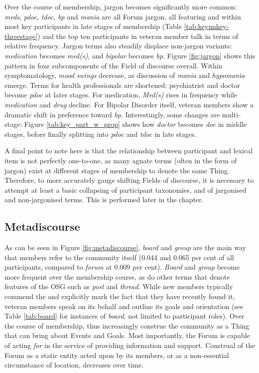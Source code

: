 Over the course of membership, jargon becomes significantly more common: \emph{meds}, \emph{pdoc}, \emph{tdoc}, \emph{bp} and \emph{mania} are all \gls{Forum} jargon, all featuring and within most key participants in late stages of membership (Table \ref{tab:keyunkey-threestage}) and the top ten participants in veteran \gls{member} talk in terms of relative frequency. Jargon terms also steadily displace non\hyp{}jargon variants: \emph{medication} becomes \emph{med(s)}, and \emph{bipolar} becomes \emph{bp}. Figure \ref{fig:jargon} shows this pattern in four subcomponents of the Field of discourse overall. Within symptomatology, \emph{mood swings} decrease, as discussion of \emph{mania} and \emph{hypomania} emerge. Terms for health professionals are shortened: psychiatrist and doctor become \emph{pdoc} at later stages. For medication, \emph{Med(s)} rises in frequency while \emph{medication} and \emph{drug} decline. For Bipolar Disorder itself, veteran members show a dramatic shift in preference toward \emph{bp}. Interestingly, some changes are multi\hyp{}stage: Figure \ref{tab:key_part_w_prop} shows how \emph{doctor} becomes \emph{doc} in middle stages, before finally splitting into \emph{pdoc} and \emph{tdoc} in late stages.

A final point to note here is that the relationship between participant and lexical item is not perfectly one\hyp{}to\hyp{}one, as many agnate terms (often in the form of jargon) exist at different stages of membership to denote the same Thing. Therefore, to more accurately gauge shifting Fields of discourse, it is necessary to attempt at least a basic collapsing of participant taxonomies, and of jargonised and non\hyp{}jargonised terms. This is performed later in the chapter.

\subsection{Metadiscourse}

As can be seen in Figure \ref{fig:metadiscourse}, \emph{board} and \emph{group} are the main way that members refer to the community itself (0.044 and 0.065 per cent of all participants, compared to \emph{forum} at 0.009 per cent). \emph{Board} and \emph{group} become more frequent over the membership course, as do other terms that denote features of the \gls{OSG} such as \emph{post} and \emph{thread}. While new \glspl{member} typically commend the  and explicitly mark the fact that they have recently found it, veteran \glspl{member} speak on its behalf and outline its goals and orientation (see Table \ref{tab:board} for instances of \emph{board}, not limited to participant roles). Over the course of membership,  thus increasingly construe the community as a Thing that can bring about Events and Goals. Most importantly, the \gls{Forum} is capable of acting \emph{for}  in the service of providing information and support. Construal of the \gls{Forum} as a static entity acted upon by its \glspl{member}, or as a non\hyp{}essential circumstance of location, decreases over time.

